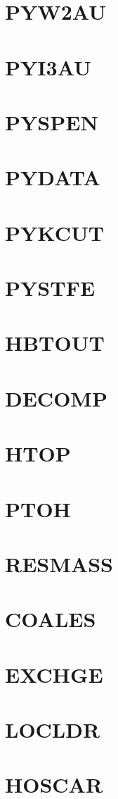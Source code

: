 \documentclass[14pt,UTF8]{ctexbook}
\begin{document}
\section{PYW2AU}
\section{PYI3AU}
\section{PYSPEN}
\section{PYDATA}
\section{PYKCUT}
\section{PYSTFE}
\section{HBTOUT}
\section{DECOMP}
\section{HTOP}
\section{PTOH}
\section{RESMASS}
\section{COALES}
\section{EXCHGE}
\section{LOCLDR}
\section{HOSCAR}
\end{document}
